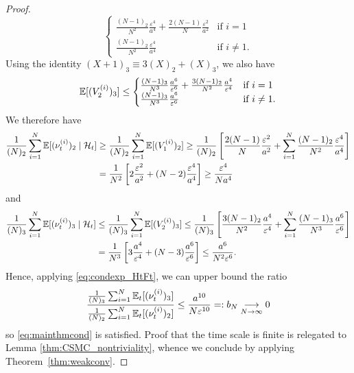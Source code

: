 \begin{proof}
\begin{equation*}
\begin{cases}
\frac{(N-1)_2}{N^2}\frac{\varepsilon^4}{a^4} 
        + \frac{2(N-1)}{N} \frac{\varepsilon^2}{a^2} &\text{if } i=1 \\
\frac{(N-1)_2}{N^2}\frac{\varepsilon^4}{a^4} &\text{if } i\neq 1 .
\end{cases}
\end{equation*}
Using the identity $(X+1)_3 \equiv 3(X)_2 +(X)_3$, we also have
\begin{equation*}
\mathbb{E}[ (V_2^{(i)} )_3 ]
\leq \begin{cases}
\frac{(N-1)_3}{N^3}\frac{a^6}{\varepsilon^6} 
        + \frac{3(N-1)_2}{N^2} \frac{a^4}{\varepsilon^4} &\text{if } i=1 \\
\frac{(N-1)_3}{N^3}\frac{a^6}{\varepsilon^6}  &\text{if } i\neq 1 .
\end{cases}
\end{equation*}
We therefore have
\begin{align}
\frac{1}{(N)_2} \sum_{i=1}^N \mathbb{E}[ (\nu_t^{(i)})_2 \mid \mathcal{H}_t ]
&\geq \frac{1}{(N)_2} \sum_{i=1}^N \mathbb{E}[ ( V_1^{(i)} )_2 ]
\geq \frac{1}{(N)_2} \left[ \frac{2(N-1)}{N} \frac{\varepsilon^2}{a^2}
        + \sum_{i=1}^N \frac{(N-1)_2}{N^2}\frac{\varepsilon^4}{a^4} \right] \notag\\
&= \frac{1}{N^2} \left[ 2 \frac{\varepsilon^2}{a^2} 
        + (N-2) \frac{\varepsilon^4}{a^4} \right]
   \geq \frac{\varepsilon^4}{Na^4} \label{eq:csmc_cN_LB}
\end{align}
and
\begin{align*}
\frac{1}{(N)_3} \sum_{i=1}^N \mathbb{E}[ (\nu_t^{(i)})_3 \mid \mathcal{H}_t ]
&\leq \frac{1}{(N)_3} \sum_{i=1}^N \mathbb{E}[ ( V_2^{(i)} )_3 ]
\leq \frac{1}{(N)_3} \left[ \frac{3(N-1)_2}{N^2} \frac{a^4}{\varepsilon^4}
        + \sum_{i=1}^N \frac{(N-1)_3}{N^3}\frac{a^6}{\varepsilon^6}  \right] \\
&= \frac{1}{N^3} \left[ 3 \frac{a^4}{\varepsilon^4} 
        + (N-3) \frac{a^6}{\varepsilon^6} \right]
    \leq \frac{a^6}{N^2 \varepsilon^6} .
\end{align*}
Hence, applying \eqref{eq:condexp_HtFt}, we can upper bound the ratio
\begin{equation*}
\frac{\frac{1}{(N)_3} \sum_{i=1}^N \mathbb{E}_t[ (\nu_t^{(i)})_3 ]}{\frac{1}{(N)_2} 
        \sum_{i=1}^N \mathbb{E}_t[ (\nu_t^{(i)})_2 ]}
\leq \frac{a^{10}}{N\varepsilon^{10}}
=: b_N 
\underset{N\to\infty}{\longrightarrow} 0
\end{equation*}
so \eqref{eq:mainthmcond} is satisfied. 
Proof that the time scale is finite is relegated to Lemma \ref{thm:CSMC_nontriviality}, whence we conclude by applying Theorem~\ref{thm:weakconv}.


\end{proof}
